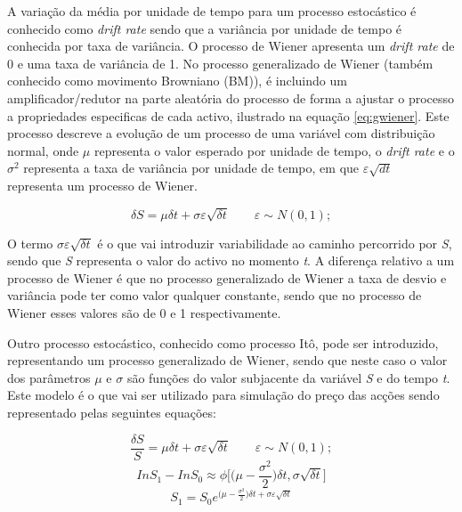 \documentclass[
  12pt,
  a4paper,
  openany]{book}
\theoremstyle{definition}
\theoremstyle{definition}
\theoremstyle{definition}
\theoremstyle{remark}
\begin{document}
A variação da média por unidade de tempo para um processo estocástico é conhecido como \emph{drift rate} sendo que a variância por unidade de tempo é conhecida por taxa de variância. O processo de Wiener apresenta um \emph{drift rate} de 0 e uma taxa de variância de 1. No processo generalizado de Wiener (também conhecido como movimento Browniano (BM)), é incluindo um amplificador/redutor na parte aleatória do processo de forma a ajustar o processo a propriedades especificas de cada activo, ilustrado na equação \eqref{eq:gwiener}. Este processo descreve a evolução de um processo de uma variável com distribuição normal, onde \(\mu\) representa o valor esperado por unidade de tempo, o \emph{drift rate} e o \(\sigma^2\) representa a taxa de variância por unidade de tempo, em que \(\varepsilon \sqrt{dt}\qquad\) representa um processo de Wiener.

\begin{equation} 
  \delta S = \mu\delta t +\sigma\varepsilon\sqrt{\delta t}\qquad\varepsilon \sim N(0,1);
  \label{eq:gwiener}
\end{equation}

O termo \(\sigma\varepsilon\sqrt{\delta t}\) é o que vai introduzir variabilidade ao caminho percorrido por \emph{S}, sendo que \emph{S} representa o valor do activo no momento \emph{t}. A diferença relativo a um processo de Wiener é que no processo generalizado de Wiener a taxa de desvio e variância pode ter como valor qualquer constante, sendo que no processo de Wiener esses valores são de 0 e 1 respectivamente.

Outro processo estocástico, conhecido como processo Itô, pode ser introduzido, representando um processo generalizado de Wiener, sendo que neste caso o valor dos parâmetros \(\mu\) e \(\sigma\) são funções do valor subjacente da variável \emph{S} e do tempo \emph{t}. Este modelo é o que vai ser utilizado para simulação do preço das acções sendo representado pelas seguintes equações:

\begin{equation} 
  \frac{\delta S}{S} = \mu\delta t +\sigma\varepsilon\sqrt{\delta t}\qquad\varepsilon \sim N(0,1);
  \label{eq:ito}
\end{equation}
\begin{equation} 
  In S_1 - InS_0 \approx\phi\Big[\Big(\mu-\frac{\sigma^2}{2}\Big)\delta t, \sigma\sqrt{\delta t}\Big]
  \label{eq:Inito}
\end{equation}
\begin{equation} 
  S_1 =S_0 e^{\Big(\mu-\frac{\sigma^2}{2}\Big)\delta t + \sigma\varepsilon\sqrt{\delta t}}
  \label{eq:logprice}
\end{equation}
\end{document}
